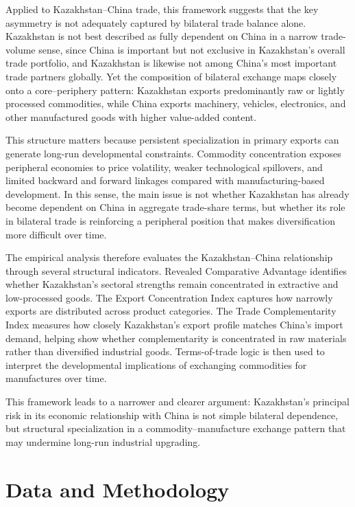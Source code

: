 \documentclass[12pt]{article}
\begin{document}
Applied to Kazakhstan--China trade, this framework suggests that the key asymmetry is not adequately captured by bilateral trade balance alone. Kazakhstan is not best described as fully dependent on China in a narrow trade-volume sense, since China is important but not exclusive in Kazakhstan's overall trade portfolio, and Kazakhstan is likewise not among China's most important trade partners globally. Yet the composition of bilateral exchange maps closely onto a core--periphery pattern: Kazakhstan exports predominantly raw or lightly processed commodities, while China exports machinery, vehicles, electronics, and other manufactured goods with higher value-added content.

This structure matters because persistent specialization in primary exports can generate long-run developmental constraints. Commodity concentration exposes peripheral economies to price volatility, weaker technological spillovers, and limited backward and forward linkages compared with manufacturing-based development. In this sense, the main issue is not whether Kazakhstan has already become dependent on China in aggregate trade-share terms, but whether its role in bilateral trade is reinforcing a peripheral position that makes diversification more difficult over time.

The empirical analysis therefore evaluates the Kazakhstan--China relationship through several structural indicators. Revealed Comparative Advantage identifies whether Kazakhstan's sectoral strengths remain concentrated in extractive and low-processed goods. The Export Concentration Index captures how narrowly exports are distributed across product categories. The Trade Complementarity Index measures how closely Kazakhstan's export profile matches China's import demand, helping show whether complementarity is concentrated in raw materials rather than diversified industrial goods. Terms-of-trade logic is then used to interpret the developmental implications of exchanging commodities for manufactures over time.

This framework leads to a narrower and clearer argument: Kazakhstan's principal risk in its economic relationship with China is not simple bilateral dependence, but structural specialization in a commodity--manufacture exchange pattern that may undermine long-run industrial upgrading.

\section{Data and Methodology}
\end{document}
